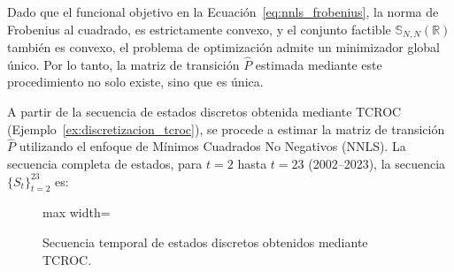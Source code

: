 \begin{remark}
Dado que el funcional objetivo en la Ecuación~\ref{eq:nnls_frobenius}, la norma de Frobenius al cuadrado, es estrictamente convexo, y el conjunto factible \(\mathbb{S}_{N,N}(\mathbb{R})\) también es convexo, el problema de optimización admite un minimizador global único. Por lo tanto, la matriz de transición \(\hat{P}\) estimada mediante este procedimiento no solo existe, sino que es única.
\end{remark}

\begin{examplex}
\label{ex:estimacion_nnls_pib_completa}
A partir de la secuencia de estados discretos obtenida mediante TCROC (Ejemplo~\ref{ex:discretizacion_tcroc}), se procede a estimar la matriz de transición \(\hat{P}\) utilizando el enfoque de Mínimos Cuadrados No Negativos (NNLS). La secuencia completa de estados, para \(t = 2\) hasta \(t = 23\) (2002--2023), la secuencia \( \{S_t\}_{t=2}^{23} \)
 es:
\begin{figure}[htbp]
\centering
\begin{adjustbox}{max width=\textwidth}
\end{adjustbox}
\caption{Secuencia temporal de estados discretos obtenidos mediante TCROC.}
\label{fig:secuencia_estados}
\end{figure}


\end{examplex}
